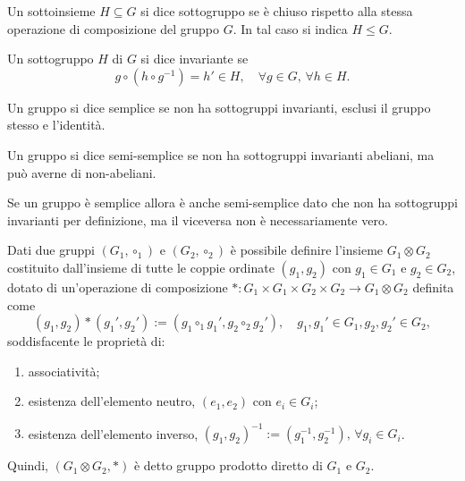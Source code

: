 \begin{defn}[sottogruppo]
    Un sottoinsieme $H\subseteq G$ si dice sottogruppo se è chiuso rispetto alla stessa operazione di composizione del gruppo $G$. In tal caso si indica $H\le G$.
\end{defn}
\begin{defn}
    Un sottogruppo $H$ di $G$ si dice invariante se
    \begin{equation}
        g\circ(h \circ g^{-1}) = h'\in H,\quad\forall g\in G,\,\forall h\in H.
    \end{equation}
\end{defn}
\begin{defn}
    Un gruppo si dice semplice se non ha sottogruppi invarianti, esclusi il gruppo stesso e l'identità.
\end{defn}
\begin{defn}
    Un gruppo si dice semi-semplice se non ha sottogruppi invarianti abeliani, ma può averne di non-abeliani.
\end{defn}
Se un gruppo è semplice allora è anche semi-semplice dato che non ha sottogruppi invarianti per definizione, ma il viceversa non è necessariamente vero.
\begin{defn}
    Dati due gruppi $(G_1,\circ_1)$ e $(G_2,\circ_2)$ è possibile definire l'insieme $G_1\otimes G_2$ costituito dall'insieme di tutte le coppie ordinate $(g_1,g_2)$ con $g_1\in G_1$ e $g_2\in G_2$, dotato di un'operazione di composizione $* : G_1\times G_1\times G_2\times G_2\to G_1\otimes G_2$ definita come
    \begin{equation}
        (g_1,g_2) * (g_1',g_2') := (g_1\circ_1 g_1',g_2\circ_2 g_2'),\quad g_1,g_1'\in G_1,g_2,g_2'\in G_2,
    \end{equation}
    soddisfacente le proprietà di:
    \begin{enumerate}
        \item associatività;
        \item esistenza dell'elemento neutro, $(e_1,e_2)$ con $e_i\in G_i$;
        \item esistenza dell'elemento inverso, $(g_1,g_2)^{-1} := (g_1^{-1},g_2^{-1}),\,\forall g_i\in G_i$.
    \end{enumerate}
    Quindi, $(G_1\otimes G_2,*)$ è detto gruppo prodotto diretto di $G_1$ e $G_2$.
\end{defn}

